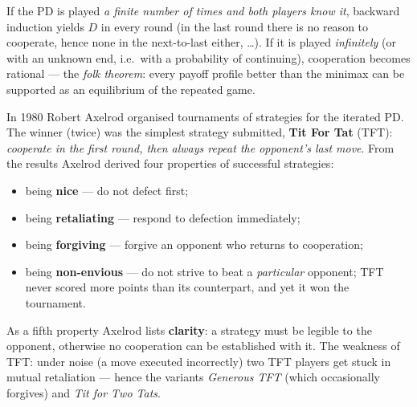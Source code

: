 \documentclass[11pt,a4paper]{article}
\theoremstyle{definition}
\begin{document}
\begin{defbox}
If the PD is played \emph{a finite number of times and both players know it}, backward induction yields
$D$ in every round (in the last round there is no reason to cooperate, hence none in the
next-to-last either, \dots). If it is played \emph{infinitely} (or with an unknown end, i.e.\ with a
probability of continuing), cooperation becomes rational --- the \emph{folk theorem}: every payoff
profile better than the minimax can be supported as an equilibrium of the repeated game.

In 1980 Robert Axelrod organised tournaments of strategies for the iterated PD. The winner (twice) was
the simplest strategy submitted, \textbf{Tit For Tat} (TFT):
\emph{cooperate in the first round, then always repeat the opponent's last move}. From the results
Axelrod derived four properties of successful strategies:
\begin{itemize}
\item being \textbf{nice} --- do not defect first;
\item being \textbf{retaliating} --- respond to defection immediately;
\item being \textbf{forgiving} --- forgive an opponent who returns to cooperation;
\item being \textbf{non-envious} --- do not strive to beat a \emph{particular} opponent; TFT never
  scored more points than its counterpart, and yet it won the tournament.
\end{itemize}
As a fifth property Axelrod lists \textbf{clarity}: a strategy must be legible to the opponent,
otherwise no cooperation can be established with it.
The weakness of TFT: under noise (a move executed incorrectly) two TFT players get stuck in mutual
retaliation --- hence the variants \emph{Generous TFT} (which occasionally forgives) and
\emph{Tit for Two Tats}.
\end{defbox}
\end{document}
